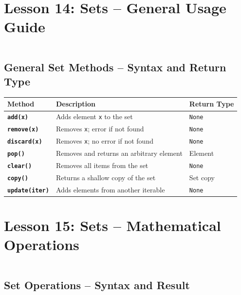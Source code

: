 \documentclass[a4paper,11pt]{article}
\begin{document}
	\section{Lesson 14: Sets – General Usage Guide}
	\inputminted{python}{Python_Files/sets_guid_general.py}
	
	\vspace{1em}
	\subsection*{General Set Methods – Syntax and Return Type}
	
	\begin{tabular}{>{\bfseries}p{3.5cm} p{7cm} p{3cm}}
		\toprule
		Method & Description & Return Type \\
		\midrule
		
		\texttt{add(x)}       & Adds element \texttt{x} to the set & \texttt{None} \\
		\texttt{remove(x)}    & Removes \texttt{x}; error if not found & \texttt{None} \\
		\texttt{discard(x)}   & Removes \texttt{x}; no error if not found & \texttt{None} \\
		\texttt{pop()}        & Removes and returns an arbitrary element & Element \\
		\texttt{clear()}      & Removes all items from the set & \texttt{None} \\
		\texttt{copy()}       & Returns a shallow copy of the set & Set copy \\
		\texttt{update(iter)} & Adds elements from another iterable & \texttt{None} \\
		
		\bottomrule
	\end{tabular}
	
	\section{Lesson 15: Sets – Mathematical Operations}
	\inputminted{python}{Python_Files/sets_math_guid.py}
	
	\vspace{1em}
	\subsection*{Set Operations – Syntax and Result}
	
\end{document}
